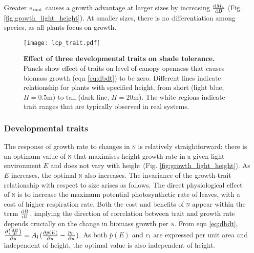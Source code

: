 \documentclass[9pt,twocolumn,twoside,lineno]{pnas-new}
\newcommand{\hmat}{\textsc{h}$_{\rm mat}$}
\newcommand{\nitrogen}{\textsc{n}}
\begin{document}
Greater {\hmat} causes a growth advantage at larger sizes by increasing $\frac{{\rm d}M_{\rm a}}{{\rm d}B}$ (Fig. \ref{fig:growth_light_height}). At smaller sizes, there is no differentiation among species, as all plants focus on growth.

\begin{SCfigure*}[\sidecaptionrelwidth][b]
\centering
\texttt{[image: lcp\_trait.pdf]}
\caption{\textbf{Effect of three developmental traits on shade tolerance.}
Panels show effect of traits on level of canopy openness that causes biomass growth (eqn \ref{eq:dbdt}) to be zero. Different lines indicate relationship for plants with specified height, from short (light blue,  $H=0.5$m) to tall (dark line, $H=20$m). The white regions indicate trait ranges that are typically observed in real systems.
\label{fig:wplcp}}
\end{SCfigure*}

\subsubsection{Developmental traits}  The response of growth rate to changes in {\nitrogen} is relatively straightforward: there is an optimum value of {\nitrogen} that maximises height growth rate in a given light environment $E$ and does not vary with height (Fig. \ref{fig:growth_light_height}). As $E$ increases, the optimal {\nitrogen} also increases. The invariance of the growth-trait relationship with respect to size arises as follows. The direct physiological effect of {\nitrogen} is to increase the maximum potential photosynthetic rate of leaves, with a cost of higher respiration rate. Both the cost and benefits of {\nitrogen} appear within the term $\frac{ {\rm d}B}{{\rm d}t}$, implying the direction of correlation between trait and growth rate depends crucially on the change in biomass growth per {\nitrogen}.
From eqn \ref{eq:dbdt}, $\frac{\partial \left( \frac{ {\rm d}B} {{\rm d}t}\right)}{\partial
u} = A_{\rm l} \, (\frac{ \partial \bar{p}(E)}{\partial
u}  - \frac{ \partial r_{\rm l}}{\partial
u} )$. As both $\bar{p}(E)$ and $r_{\rm l}$ are expressed per unit area and independent of height, the optimal value is also independent of height.
\end{document}
